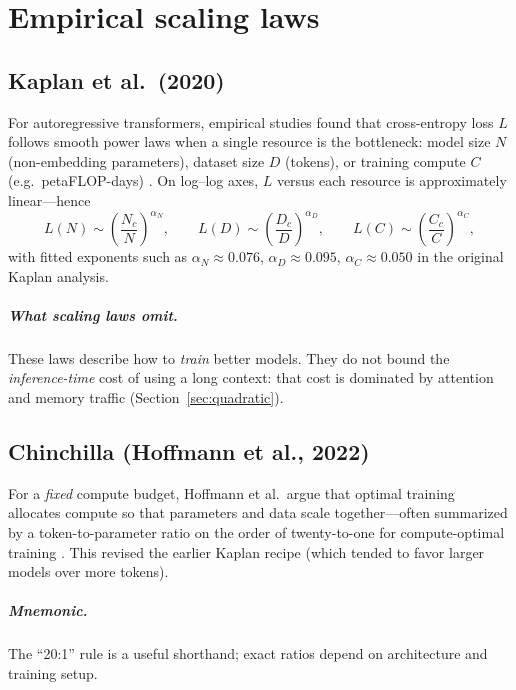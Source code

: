 \chapter{Empirical scaling laws}

\section{Kaplan et al.\ (2020)}

For autoregressive transformers, empirical studies found that cross-entropy loss $L$ follows smooth
power laws when a single resource is the bottleneck: model size $N$ (non-embedding parameters),
dataset size $D$ (tokens), or training compute $C$ (e.g.\ petaFLOP-days) \cite{kaplan2020scaling}.
On log--log axes, $L$ versus each resource is approximately linear---hence
\begin{equation}
  L(N) \sim \left(\frac{N_c}{N}\right)^{\alpha_N}, \qquad
  L(D) \sim \left(\frac{D_c}{D}\right)^{\alpha_D}, \qquad
  L(C) \sim \left(\frac{C_c}{C}\right)^{\alpha_C},
\end{equation}
with fitted exponents such as $\alpha_N \approx 0.076$, $\alpha_D \approx 0.095$, $\alpha_C \approx 0.050$
in the original Kaplan analysis.

\paragraph{What scaling laws omit.}
These laws describe how to \emph{train} better models. They do not bound the \emph{inference-time}
cost of using a long context: that cost is dominated by attention and memory traffic (Section~\ref{sec:quadratic}).

\section{Chinchilla (Hoffmann et al., 2022)}

For a \emph{fixed} compute budget, Hoffmann et al.\ argue that optimal training allocates compute so that
parameters and data scale together---often summarized by a token-to-parameter ratio on the order of
twenty-to-one for compute-optimal training \cite{hoffmann2022training}. This revised the earlier Kaplan
recipe (which tended to favor larger models over more tokens).

\paragraph{Mnemonic.}
The ``20:1'' rule is a useful shorthand; exact ratios depend on architecture and training setup.
